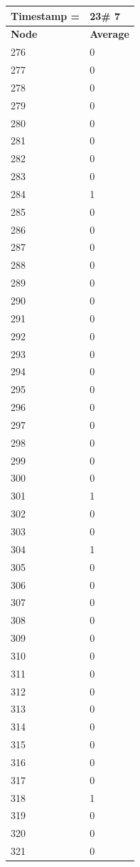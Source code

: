 \begin{tabular}{|l||l|}
\hline
\textbf{Timestamp =} & \textbf{23}\# 7\\\hline
	\textbf{Node} & \textbf{Average} \\ \hline
\hline
	276 & 0 \\ \hline
	277 & 0 \\ \hline
	278 & 0 \\ \hline
	279 & 0 \\ \hline
	280 & 0 \\ \hline
	281 & 0 \\ \hline
	282 & 0 \\ \hline
	283 & 0 \\ \hline
	284 & 1 \\ \hline
	285 & 0 \\ \hline
	286 & 0 \\ \hline
	287 & 0 \\ \hline
	288 & 0 \\ \hline
	289 & 0 \\ \hline
	290 & 0 \\ \hline
	291 & 0 \\ \hline
	292 & 0 \\ \hline
	293 & 0 \\ \hline
	294 & 0 \\ \hline
	295 & 0 \\ \hline
	296 & 0 \\ \hline
	297 & 0 \\ \hline
	298 & 0 \\ \hline
	299 & 0 \\ \hline
	300 & 0 \\ \hline
	301 & 1 \\ \hline
	302 & 0 \\ \hline
	303 & 0 \\ \hline
	304 & 1 \\ \hline
	305 & 0 \\ \hline
	306 & 0 \\ \hline
	307 & 0 \\ \hline
	308 & 0 \\ \hline
	309 & 0 \\ \hline
	310 & 0 \\ \hline
	311 & 0 \\ \hline
	312 & 0 \\ \hline
	313 & 0 \\ \hline
	314 & 0 \\ \hline
	315 & 0 \\ \hline
	316 & 0 \\ \hline
	317 & 0 \\ \hline
	318 & 1 \\ \hline
	319 & 0 \\ \hline
	320 & 0 \\ \hline
	321 & 0 \\ \hline
\end{tabular}

